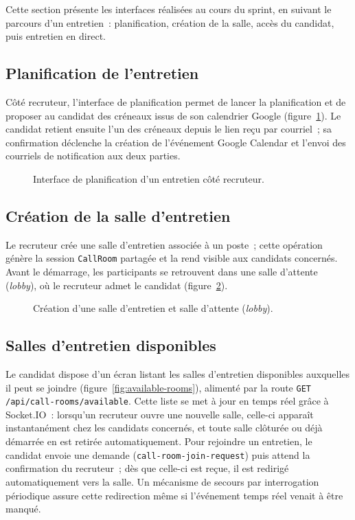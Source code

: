 Cette section présente les interfaces réalisées au cours du sprint, en suivant le parcours d'un entretien~: planification, création de la salle, accès du candidat, puis entretien en direct.

\subsection{Planification de l'entretien}

Côté recruteur, l'interface de planification permet de lancer la planification et de proposer au candidat des créneaux issus de son calendrier Google (figure~\ref{fig:scheduling-ui}). Le candidat retient ensuite l'un des créneaux depuis le lien reçu par courriel~; sa confirmation déclenche la création de l'événement Google Calendar et l'envoi des courriels de notification aux deux parties.

\begin{figure}[H]
  \centering
  \caption{Interface de planification d'un entretien côté recruteur.}
  \label{fig:scheduling-ui}
\end{figure}

\subsection{Création de la salle d'entretien}

Le recruteur crée une salle d'entretien associée à un poste~; cette opération génère la session \texttt{CallRoom} partagée et la rend visible aux candidats concernés. Avant le démarrage, les participants se retrouvent dans une salle d'attente (\textit{lobby}), où le recruteur admet le candidat (figure~\ref{fig:room-creation}).

\begin{figure}[H]
  \centering
  \caption{Création d'une salle d'entretien et salle d'attente (\textit{lobby}).}
  \label{fig:room-creation}
\end{figure}

\subsection{Salles d'entretien disponibles}

Le candidat dispose d'un écran listant les salles d'entretien disponibles auxquelles il peut se joindre (figure~\ref{fig:available-rooms}), alimenté par la route \texttt{GET /api/call-rooms/available}. Cette liste se met à jour en temps réel grâce à Socket.IO~: lorsqu'un recruteur ouvre une nouvelle salle, celle-ci apparaît instantanément chez les candidats concernés, et toute salle clôturée ou déjà démarrée en est retirée automatiquement. Pour rejoindre un entretien, le candidat envoie une demande (\texttt{call-room-join-request}) puis attend la confirmation du recruteur~; dès que celle-ci est reçue, il est redirigé automatiquement vers la salle. Un mécanisme de secours par interrogation périodique assure cette redirection même si l'événement temps réel venait à être manqué.

